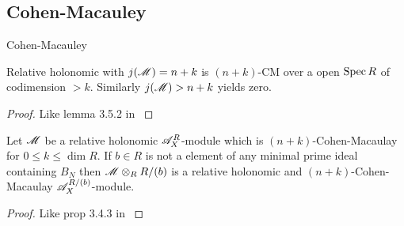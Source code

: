 \subsection{Cohen-Macauley}
\begin{definition}
  Cohen-Macauley
\end{definition}
\begin{lemma}\label{lem: GradeToCMOverOpen}
  Relative holonomic with $j(\mathscr{M})= n+k$ is $(n+k)$-CM over a open $\operatorname{Spec} R$ of codimension $>k$. Similarly $j(\mathscr{M})> n+k$ yields zero.
\end{lemma}
\begin{proof}
  Like lemma 3.5.2 in \cite{budur2019zero}
\end{proof}

\begin{lemma}\label{lem: RestrictToCM}
  Let $\mathscr{M}$ be a relative holonomic $\mathscr{A}_X^R$-module which is $(n+k)$-Cohen-Macaulay for $0\leq k \leq \dim R$. If $b\in R$ is not a element of any minimal prime ideal containing $B_N$ then $\mathscr{M} \otimes_R R/(b)$ is a relative holonomic and $(n+k)$-Cohen-Macaulay  $\mathscr{A}_X^{R/(b)}$-module.
\end{lemma}
\begin{proof}
  Like prop 3.4.3 in \cite{budur2019zero}
\end{proof}

